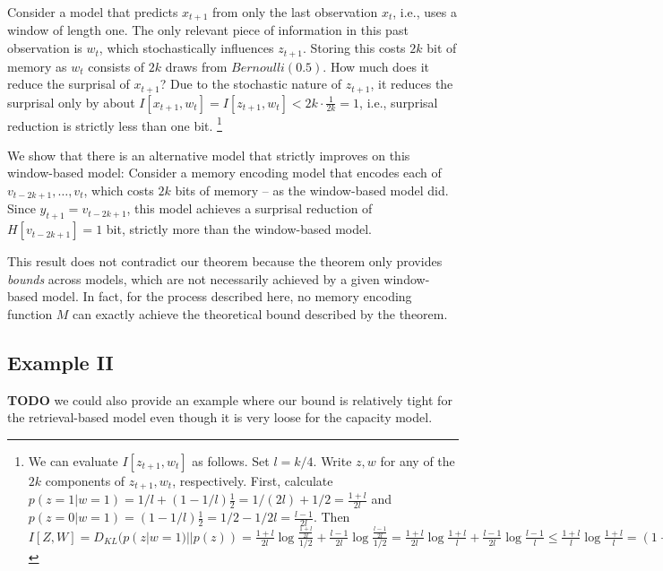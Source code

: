 \documentclass[11pt,letterpaper]{article}
\newcounter{theorem}
\begin{document}
Consider a model that predicts $x_{t+1}$ from only the last observation $x_t$, i.e., uses a window of length one.
The only relevant piece of information in this past observation is $w_t$, which stochastically influences $z_{t+1}$.
Storing this costs $2k$ bit of memory as $w_t$ consists of $2k$ draws from $Bernoulli(0.5)$.
How much does it reduce the surprisal of $x_{t+1}$?
Due to the stochastic nature of $z_{t+1}$, it reduces the surprisal only by about $I[x_{t+1}, w_t] = I[z_{t+1}, w_t] < 2k \cdot \frac{1}{2k} = 1$, i.e., surprisal reduction is strictly less than one bit.
\footnote{We can evaluate $I[z_{t+1}, w_t]$ as follows. Set $l = k/4$. Write $z, w$ for any of the $2k$ components of $z_{t+1}, w_t$, respectively. First, calculate $p(z = 1|w=1) = 1/l + (1-1/l) \frac{1}{2} = 1/(2l) + 1/2 = \frac{1+l}{2l}$ and $p(z = 0|w=1) = (1-1/l) \frac{1}{2} = 1/2 - 1/2l = \frac{l-1}{2l}$.
Then $I[Z, W] = D_{KL}(p(z|w=1)||p(z)) = \frac{1+l}{2l} \log \frac{\frac{1+l}{2l}}{1/2} + \frac{l-1}{2l} \log \frac{\frac{l-1}{2l}}{1/2}  = \frac{1+l}{2l} \log \frac{1+l}{l} + \frac{l-1}{2l} \log \frac{l-1}{l}  \leq \frac{1+l}{l} \log \frac{1+l}{l} =  (1+1/l) \log (1+1/l)  \leq  (1+1/l) (1/l) = 1/l + 1/l^2 < 2/l = \frac{1}{2k}.$
}

We show that there is an alternative model that strictly improves on this window-based model:
Consider a memory encoding model that encodes each of $v_{t-2k+1}, \dots, v_{t}$, which costs $2k$ bits of memory -- as the window-based model did.
Since $y_{t+1} = v_{t-2k+1}$, this model achieves a surprisal reduction of $H[v_{t-2k+1}] = 1$ bit, strictly more than the window-based model.


This result does not contradict our theorem because the theorem only provides \emph{bounds} across models, which are not necessarily achieved by a given window-based model.
In fact, for the process described here, no memory encoding function $M$ can exactly achieve the theoretical bound described by the theorem.

\subsection{Example II}

\textbf{TODO} we could also provide an example where our bound is relatively tight for the retrieval-based model even though it is very loose for the capacity model.
\end{document}
